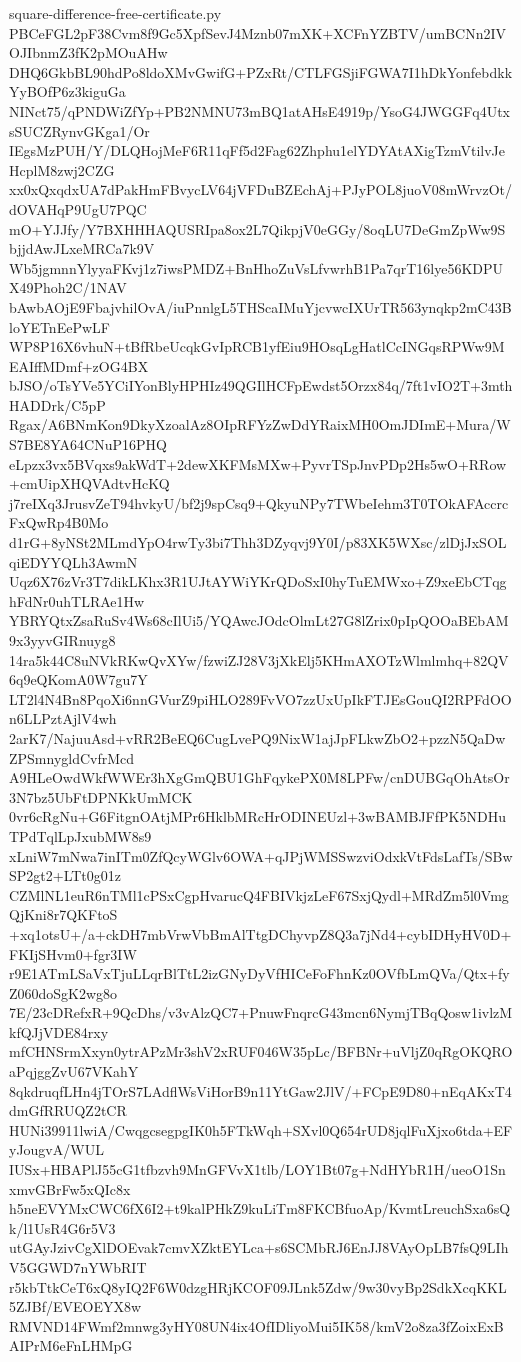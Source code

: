 \documentclass[11pt]{article}
\theoremstyle{definition}
\theoremstyle{remark}
\begin{document}
\begin{filecontents*}[overwrite]{square-difference-free-certificate.py}
PBCeFGL2pF38Cvm8f9Gc5XpfSevJ4Mznb07mXK+XCFnYZBTV/umBCNn2IVOJIbnmZ3fK2pMOuAHw
DHQ6GkbBL90hdPo8ldoXMvGwifG+PZxRt/CTLFGSjiFGWA7I1hDkYonfebdkkYyBOfP6z3kiguGa
NINct75/qPNDWiZfYp+PB2NMNU73mBQ1atAHsE4919p/YsoG4JWGGFq4UtxsSUCZRynvGKga1/Or
IEgsMzPUH/Y/DLQHojMeF6R11qFf5d2Fag62Zhphu1elYDYAtAXigTzmVtilvJeHcplM8zwj2CZG
xx0xQxqdxUA7dPakHmFBvycLV64jVFDuBZEchAj+PJyPOL8juoV08mWrvzOt/dOVAHqP9UgU7PQC
mO+YJJfy/Y7BXHHHAQUSRIpa8ox2L7QikpjV0eGGy/8oqLU7DeGmZpWw9SbjjdAwJLxeMRCa7k9V
Wb5jgmnnYlyyaFKvj1z7iwsPMDZ+BnHhoZuVsLfvwrhB1Pa7qrT16lye56KDPUX49Phoh2C/1NAV
bAwbAOjE9FbajvhilOvA/iuPnnlgL5THScaIMuYjcvwcIXUrTR563ynqkp2mC43BloYETnEePwLF
WP8P16X6vhuN+tBfRbeUcqkGvIpRCB1yfEiu9HOsqLgHatlCcINGqsRPWw9MEAIffMDmf+zOG4BX
bJSO/oTsYVe5YCiIYonBlyHPHIz49QGIlHCFpEwdst5Orzx84q/7ft1vIO2T+3mthHADDrk/C5pP
Rgax/A6BNmKon9DkyXzoalAz8OIpRFYzZwDdYRaixMH0OmJDImE+Mura/WS7BE8YA64CNuP16PHQ
eLpzx3vx5BVqxs9akWdT+2dewXKFMsMXw+PyvrTSpJnvPDp2Hs5wO+RRow+cmUipXHQVAdtvHcKQ
j7reIXq3JrusvZeT94hvkyU/bf2j9spCsq9+QkyuNPy7TWbeIehm3T0TOkAFAccrcFxQwRp4B0Mo
d1rG+8yNSt2MLmdYpO4rwTy3bi7Thh3DZyqvj9Y0I/p83XK5WXsc/zlDjJxSOLqiEDYYQLh3AwmN
Uqz6X76zVr3T7dikLKhx3R1UJtAYWiYKrQDoSxI0hyTuEMWxo+Z9xeEbCTqghFdNr0uhTLRAe1Hw
YBRYQtxZsaRuSv4Ws68cIlUi5/YQAwcJOdcOlmLt27G8lZrix0pIpQOOaBEbAM9x3yyvGIRnuyg8
14ra5k44C8uNVkRKwQvXYw/fzwiZJ28V3jXkElj5KHmAXOTzWlmlmhq+82QV6q9eQKomA0W7gu7Y
LT2l4N4Bn8PqoXi6nnGVurZ9piHLO289FvVO7zzUxUpIkFTJEsGouQI2RPFdOOn6LLPztAjlV4wh
2arK7/NajuuAsd+vRR2BeEQ6CugLvePQ9NixW1ajJpFLkwZbO2+pzzN5QaDwZPSmnygldCvfrMcd
A9HLeOwdWkfWWEr3hXgGmQBU1GhFqykePX0M8LPFw/cnDUBGqOhAtsOr3N7bz5UbFtDPNKkUmMCK
0vr6cRgNu+G6FitgnOAtjMPr6HklbMRcHrODINEUzl+3wBAMBJFfPK5NDHuTPdTqlLpJxubMW8s9
xLniW7mNwa7inITm0ZfQcyWGlv6OWA+qJPjWMSSwzviOdxkVtFdsLafTs/SBwSP2gt2+LTt0g01z
CZMlNL1euR6nTMl1cPSxCgpHvarucQ4FBIVkjzLeF67SxjQydl+MRdZm5l0VmgQjKni8r7QKFtoS
+xq1otsU+/a+ckDH7mbVrwVbBmAlTtgDChyvpZ8Q3a7jNd4+cybIDHyHV0D+FKIjSHvm0+fgr3IW
r9E1ATmLSaVxTjuLLqrBlTtL2izGNyDyVfHICeFoFhnKz0OVfbLmQVa/Qtx+fyZ060doSgK2wg8o
7E/23cDRefxR+9QcDhs/v3vAlzQC7+PnuwFnqrcG43mcn6NymjTBqQosw1ivlzMkfQJjVDE84rxy
mfCHNSrmXxyn0ytrAPzMr3shV2xRUF046W35pLc/BFBNr+uVljZ0qRgOKQROaPqjggZvU67VKahY
8qkdruqfLHn4jTOrS7LAdflWsViHorB9n11YtGaw2JlV/+FCpE9D80+nEqAKxT4dmGfRRUQZ2tCR
HUNi39911lwiA/CwqgcsegpgIK0h5FTkWqh+SXvl0Q654rUD8jqlFuXjxo6tda+EFyJougvA/WUL
IUSx+HBAPlJ55cG1tfbzvh9MnGFVvX1tlb/LOY1Bt07g+NdHYbR1H/ueoO1SnxmvGBrFw5xQIc8x
h5neEVYMxCWC6fX6I2+t9kalPHkZ9kuLiTm8FKCBfuoAp/KvmtLreuchSxa6sQk/l1UsR4G6r5V3
utGAyJzivCgXlDOEvak7cmvXZktEYLca+s6SCMbRJ6EnJJ8VAyOpLB7fsQ9LIhV5GGWD7nYWbRIT
r5kbTtkCeT6xQ8yIQ2F6W0dzgHRjKCOF09JLnk5Zdw/9w30vyBp2SdkXcqKKL5ZJBf/EVEOEYX8w
RMVND14FWmf2mnwg3yHY08UN4ix4OfIDliyoMui5IK58/kmV2o8za3fZoixExBAIPrM6eFnLHMpG

\end{filecontents*}
\end{document}
